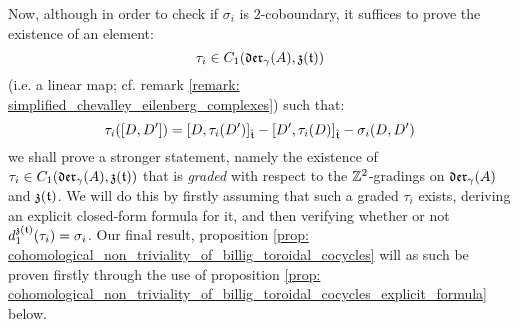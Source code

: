         Now, although in order to check if $\sigma_i$ is $2$-coboundary, it suffices to prove the existence of an element:
            $$\tau_i \in C_1(\mathfrak{der}_{\gamma}(A), \mathfrak{z}(\mathfrak{t}))$$
        (i.e. a linear map; cf. remark \ref{remark: simplified_chevalley_eilenberg_complexes}) such that:
            $$\tau_i([D, D']) = [D, \tau_i(D')]_{\hat{\mathfrak{t}}} - [D', \tau_i(D)]_{\hat{\mathfrak{t}}} - \sigma_i(D, D')$$
        we shall prove a stronger statement, namely the existence of $\tau_i \in C_1(\mathfrak{der}_{\gamma}(A), \mathfrak{z}(\mathfrak{t}))$ that is \textit{graded} with respect to the $\mathbb{Z}^2$-gradings on $\mathfrak{der}_{\gamma}(A)$ and $\mathfrak{z}(\mathfrak{t})$. We will do this by firstly assuming that such a graded $\tau_i$ exists, deriving an explicit closed-form formula for it, and then verifying whether or not $d_1^{\mathfrak{z}(\mathfrak{t})}(\tau_i) = \sigma_i$. Our final result, proposition \ref{prop: cohomological_non_triviality_of_billig_toroidal_cocycles} will as such be proven firstly through the use of proposition \ref{prop: cohomological_non_triviality_of_billig_toroidal_cocycles_explicit_formula} below.

        
